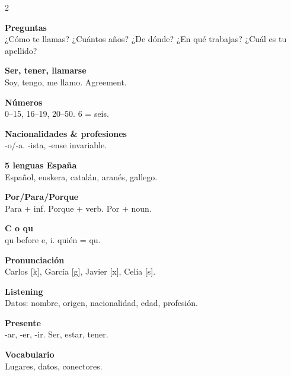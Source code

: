 \documentclass[8pt,landscape,a4paper]{article}
\begin{document}
\newpage
\vspace*{0.3em}
\noindent\color{noteblue}
\setlength{\parskip}{0.3em}
\begin{multicols}{2}

\textbf{Preguntas}\\
¿C\'omo te llamas? ¿Cu\'antos a\~nos? ¿De d\'onde? ¿En qu\'e trabajas? ¿Cu\'al es tu apellido?

\textbf{Ser, tener, llamarse}\\
Soy, tengo, me llamo. Agreement.

\textbf{N\'umeros}\\
0--15, 16--19, 20--50. 6 = seis.

\textbf{Nacionalidades \& profesiones}\\
-o/-a. -ista, -ense invariable.

\textbf{5 lenguas Espa\~na}\\
Espa\~nol, euskera, catal\'an, aran\'es, gallego.

\textbf{Por/Para/Porque}\\
Para + inf. Porque + verb. Por + noun.

\textbf{C o qu}\\
qu before e, i. qui\'en = qu.

\textbf{Pronunciaci\'on}\\
Carlos [k], Garc\'ia [g], Javier [x], Celia [s].

\textbf{Listening}\\
Datos: nombre, origen, nacionalidad, edad, profesi\'on.

\textbf{Presente}\\
-ar, -er, -ir. Ser, estar, tener.

\textbf{Vocabulario}\\
Lugares, datos, conectores.

\end{multicols}
\vfill
\normalsize\normalfont\color{black}
\end{document}
